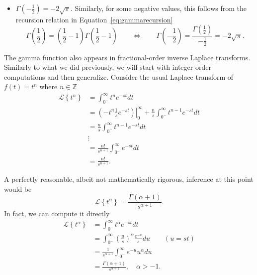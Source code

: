 \begin{itemize}
\begin{equation*}
    \end{equation*}
  \item $\boxed { \Gamma \left( -\frac{1}{2} \right) = -2 \sqrt{\pi}.  }$  Similarly, for some negative values, this follows from the recursion relation in Equation~\ref{eq:gammarecursion}
    \begin{equation*}
      \Gamma \left( \frac{1}{2} \right) = \left( \frac{1}{2} - 1 \right) \Gamma \left( \frac{1}{2} - 1 \right) \qquad \Longleftrightarrow \qquad \Gamma \left( -\frac{1}{2} \right) = \frac{\Gamma \left( \frac{1}{2} \right)}{-\frac{1}{2}} = -2 \sqrt{\pi}.
    \end{equation*}
\end{itemize}

The gamma function also appears in fractional-order inverse Laplace transforms. Similarly to what we did previously, we will start with integer-order computations and then generalize. Consider the usual Laplace transform of $f(t) = t^n$ where $n \in \mathbb Z$
\begin{align*}
  \mathcal L \left\{ t^n \right\} &= \int_{0^-}^\infty t^n e^{-s t} dt \\
  &= \left. \left( - t^n \frac{1}{s} e^{-s t} \right) \right|_0^\infty + \frac{n}{s}  \int_{0^-}^\infty t^{n-1} e^{-st} dt \\
    &= \frac{n}{s}  \int_{0^-}^\infty t^{n-1} e^{-st} dt  \\
    & \vdots \\
    &= \frac{n!}{s^{n+1}} \int_{0^-}^\infty e^{-s t} dt  \\
    &= \frac{n!}{s^{n+1}}. 
\end{align*}

A perfectly reasonable, albeit not mathematically rigorous, inference at this point would be 
\begin{equation*}
  \boxed{ \mathcal L  \left\{ t^\alpha \right\} =  \frac{\Gamma \left( \alpha + 1 \right)}{s^{\alpha + 1}}. }
\end{equation*}
In fact, we can compute it directly
\begin{align*}
  \mathcal L \left\{ t^\alpha \right\} &= \int_{0^-}^\infty t^\alpha e^{-s t} dt \\
  &= \int_{0^-}^\infty \left( \frac{u}{s} \right)^\alpha \frac{e^{-u}}{s} du \qquad \left( u = st \right) \\
  &= \frac{1}{s^{\alpha + 1}} \int_{0^-}^\infty e^{-u} u^\alpha du \\
  &= \frac{\Gamma \left( \alpha + 1 \right)}{s^{\alpha + 1}}, \quad \alpha > -1.
\end{align*}

